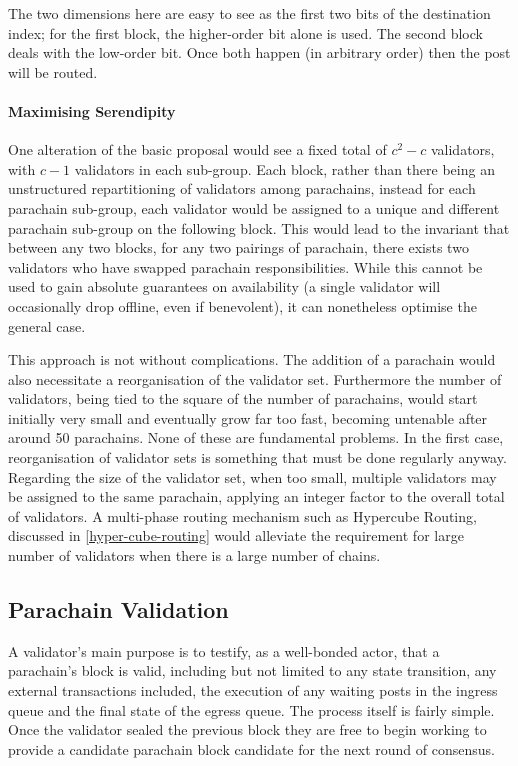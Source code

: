 \documentclass[9pt,oneside]{amsart}
\begin{document}
\begin{multicols}{2}
 The two dimensions here are easy to see as the first two bits of the destination index; for the first block, the higher-order bit alone is used. The second block deals with the low-order bit. Once both happen (in arbitrary order) then the post will be routed.

\paragraph{Maximising Serendipity}

 One alteration of the basic proposal would see a fixed total of $c^2-c$ validators, with $c-1$ validators in each sub-group. Each block, rather than there being an unstructured repartitioning of validators among parachains, instead for each parachain sub-group, each validator would be assigned to a unique and different parachain sub-group on the following block. This would lead to the invariant that between any two blocks, for any two pairings of parachain, there exists two validators who have swapped parachain responsibilities. While this cannot be used to gain absolute guarantees on availability (a single validator will occasionally drop offline, even if benevolent), it can nonetheless optimise the general case.

 This approach is not without complications. The addition of a parachain would also necessitate a reorganisation of the validator set. Furthermore the number of validators, being tied to the square of the number of parachains, would start initially very small and eventually grow far too fast, becoming untenable after around 50 parachains. None of these are fundamental problems. In the first case, reorganisation of validator sets is something that must be done regularly anyway. Regarding the size of the validator set, when too small, multiple validators may be assigned to the same parachain, applying an integer factor to the overall total of validators. A multi-phase routing mechanism such as Hypercube Routing, discussed
in \ref{hyper-cube-routing} would alleviate the requirement for large number of validators when there is a large number of chains.

\subsection{Parachain Validation}
\label{parachain-validation}

 A validator's main purpose is to testify, as a well-bonded actor, that a parachain's block is valid, including but not limited to any state transition, any external transactions included, the execution of any waiting posts in the ingress queue and the final state of the egress queue. The process itself is fairly simple. Once the validator sealed the previous block they are free to begin working to provide a candidate parachain block candidate for the next round of consensus.


\end{multicols}
\end{document}
